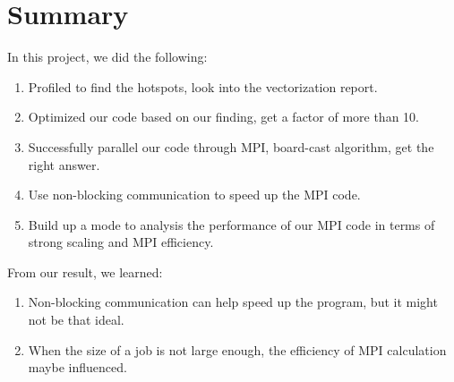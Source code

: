 \section{Summary}\label{sec:summary}

In this project, we did the following:

\begin{enumerate}
\item Profiled to find the hotspots, look into the vectorization report.
\item Optimized our code based on our finding, get a factor of more than 10.
\item Successfully parallel our code through MPI, board-cast algorithm, get the right answer.
\item Use non-blocking communication to speed up the MPI code.
\item Build up a mode to analysis the performance of our MPI code in terms of strong scaling and MPI
	  efficiency.
\end{enumerate}

From our result, we learned:

\begin{enumerate}
\item Non-blocking communication can help speed up the program, but it might not be that ideal.
\item When the size of a job is not large enough, the efficiency of MPI calculation maybe influenced.
\end{enumerate}